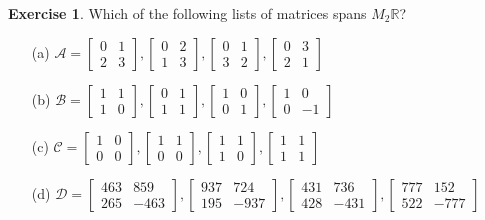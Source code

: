 \documentclass{amsart}
\newcommand{\R}         {{\mathbb{R}}}
\newcommand{\bsm}       {\left[\begin{smallmatrix}}
\newcommand{\esm}       {\end{smallmatrix}\right]}
\newcommand{\CA}        {{\mathcal{A}}}
\newcommand{\CB}        {{\mathcal{B}}}
\newcommand{\CC}        {{\mathcal{C}}}
\newcommand{\CD}        {{\mathcal{D}}}
\renewcommand{\:}       {\colon}
\theoremstyle{definition}
\newtheorem{exercise}{Exercise}[section]
\begin{document}

\begin{exercise}
 Which of the following lists of matrices spans $M_2\R$?
 \begin{itemize}\renewcommand{\itemsep}{1ex}
  \item[(a)]
   $\CA=\bsm 0&1\\2&3\esm,
        \bsm 0&2\\1&3\esm,
        \bsm 0&1\\3&2\esm,
        \bsm 0&3\\2&1\esm$
  \item[(b)]
   $\CB=\bsm 1&1\\1&0\esm,
        \bsm 0&1\\1&1\esm,
        \bsm 1&0\\0&1\esm,
        \bsm 1&0\\0&-1\esm$
  \item[(c)]
   $\CC=\bsm 1&0\\0&0\esm,
        \bsm 1&1\\0&0\esm,
        \bsm 1&1\\1&0\esm,
        \bsm 1&1\\1&1\esm$
  \item[(d)]
   $\CD=\bsm 463&859\\265&-463\esm,
        \bsm 937&724\\195&-937\esm,
        \bsm 431&736\\428&-431\esm,
        \bsm 777&152\\522&-777\esm$
 \end{itemize}
\end{exercise}
\end{document}

